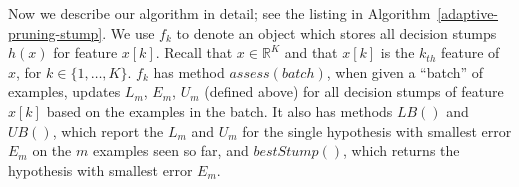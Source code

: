 Now we describe our algorithm in detail; see the
listing in Algorithm~\ref{adaptive-pruning-stump}.
We use $f_k$ to denote an object which stores all decision stumps $h(x)$ for feature
$x[k]$.
Recall that $x \in \mathbb{R}^K$ and that $x[k]$ is the $k_{th}$ feature of $x$,
for $k \in \{ 1, \dots, K \}$.
$f_k$ has method $assess(batch)$, when given a ``batch'' of examples, updates
$L_m$, $E_m$,  $U_m$ (defined above) for all decision stumps of feature $x[k]$ based
on the examples in the batch.
It also has methods $LB()$ and $UB()$, which report the $L_m$ and $U_m$ for the
single hypothesis with smallest error $E_m$ on the $m$ examples seen so far,
and $bestStump()$, which returns the hypothesis with smallest error $E_m$.


\begin{figure}
\centering
{}
\end{figure}

